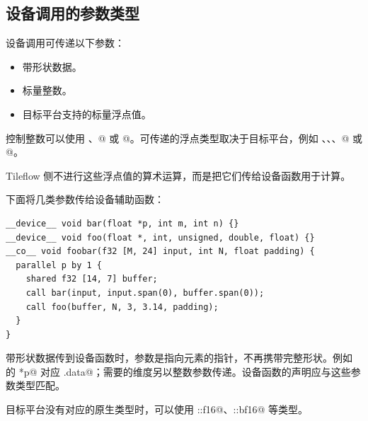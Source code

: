 \subsection*{设备调用的参数类型}

设备调用可传递以下参数：

\begin{itemize}[leftmargin=1.6em]
\item 带形状数据。
\item 标量整数。
\item 目标平台支持的标量浮点值。
\end{itemize}

控制整数可以使用 \co@int@、@ 或 @。可传递的浮点类型取决于目标平台，例如 \co@float@、\co@double@、\co@half@、@ 或 @。

Tileflow 侧不进行这些浮点值的算术运算，而是把它们传给设备函数用于计算。

下面将几类参数传给设备辅助函数：

\begin{lstlisting}[language=croqtile,caption={向设备函数传递参数}]
__device__ void bar(float *p, int m, int n) {}
__device__ void foo(float *, int, unsigned, double, float) {}
__co__ void foobar(f32 [M, 24] input, int N, float padding) {
  parallel p by 1 {
    shared f32 [14, 7] buffer;
    call bar(input, input.span(0), buffer.span(0));
    call foo(buffer, N, 3, 3.14, padding);
  }
}
\end{lstlisting}

带形状数据传到设备函数时，参数是指向元素的指针，不再携带完整形状。例如 \co@bar@ 的 \co@float *p@ 对应 \co@input.data@；需要的维度另以整数参数传递。设备函数的声明应与这些参数类型匹配。

目标平台没有对应的原生类型时，可以使用 \co@croq::f16@、\co@croq::bf16@ 等类型。
